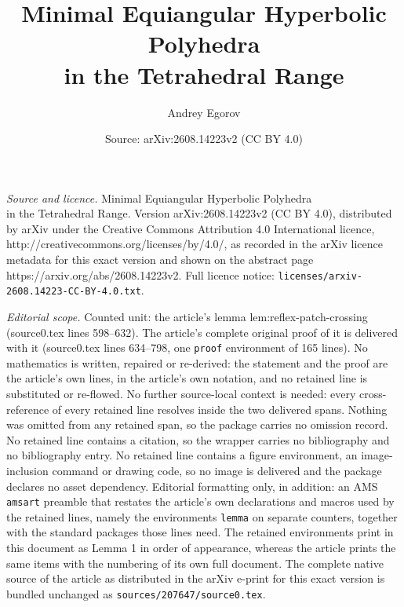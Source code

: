 \documentclass[10pt,a4paper]{amsart}
\title{Minimal Equiangular Hyperbolic Polyhedra\\ in the Tetrahedral Range}
\author{Andrey Egorov}
\date{Source: arXiv:2608.14223v2 (CC BY 4.0)}
\begin{document}
\maketitle

\noindent\emph{Source and licence.} Minimal Equiangular Hyperbolic Polyhedra\\ in the Tetrahedral Range. Version arXiv:2608.14223v2 (CC BY 4.0), distributed by arXiv under the Creative Commons Attribution 4.0 International licence, http://creativecommons.org/licenses/by/4.0/, as recorded in the arXiv licence metadata for this exact version and shown on the abstract page https://arxiv.org/abs/2608.14223v2. Full licence notice: \texttt{licenses/arxiv-2608.14223-CC-BY-4.0.txt}.\par\smallskip

\noindent\textit{Editorial scope.} Counted unit: the article's lemma lem:reflex-patch-crossing (source0.tex lines 598--632). The article's complete original proof of it is delivered with it (source0.tex lines 634--798, one \texttt{proof} environment of 165 lines). No mathematics is written, repaired or re-derived: the statement and the proof are the article's own lines, in the article's own notation, and no retained line is substituted or re-flowed.  No further source-local context is needed: every cross-reference of every retained line resolves inside the two delivered spans.  Nothing was omitted from any retained span, so the package carries no omission record.  No retained line contains a citation, so the wrapper carries no bibliography and no bibliography entry.  No retained line contains a figure environment, an image-inclusion command or drawing code, so no image is delivered and the package declares no asset dependency.  Editorial formatting only, in addition: an AMS \texttt{amsart} preamble that restates the article's own declarations and macros used by the retained lines, namely the environments \texttt{lemma} on separate counters, together with the standard packages those lines need.  The retained environments print in this document as Lemma 1 in order of appearance, whereas the article prints the same items with the numbering of its own full document.  The complete native source of the article as distributed in the arXiv e-print for this exact version is bundled unchanged as \texttt{sources/207647/source0.tex}.
\end{document}
